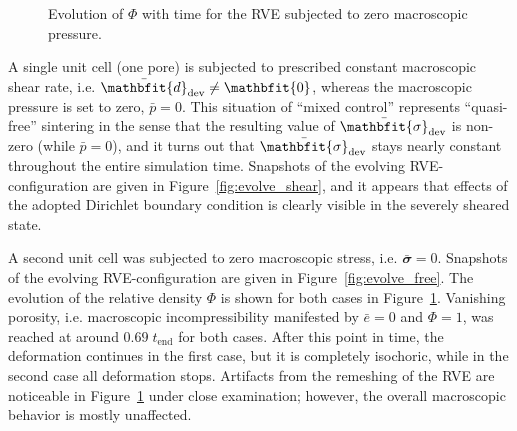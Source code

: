 \documentclass[12pt,a4paper,fleqn]{article}
\renewcommand{\ts}[1]{\mathbfit{#1}}
\newcommand{\figref}[1]{Figure~\ref{#1}}
\begin{document}
%
\begin{figure}[thpb!]
  \centering
  \caption{Evolution of $\Phi$ with time for the RVE subjected to zero macroscopic pressure.}
  \label{fig:evolve_graph}
\end{figure}


A single unit cell (one pore) is subjected to prescribed constant macroscopic shear rate, i.e. $\bar{\ts d}_\dev\neq \ts 0$, whereas the macroscopic pressure is set to zero, $\bar{p}=0$.
This situation of ``mixed control'' represents ``quasi-free'' sintering in the sense that the resulting value of $\bar{\ts\sigma}_\dev$ is non-zero (while $\bar p = 0 $), and it turns out that $\bar{\ts\sigma}_\dev$ stays nearly constant throughout the entire simulation time.
Snapshots of the evolving RVE-configuration are given in \figref{fig:evolve_shear}, and it appears that effects of the adopted Dirichlet boundary condition is clearly visible in the severely sheared state.

A second unit cell was subjected to zero macroscopic stress, i.e. $\bar{\ts\sigma} = \ts 0$. Snapshots of the evolving RVE-configuration are given in \figref{fig:evolve_free}. The evolution of the relative density $\Phi$ is shown for both cases in \figref{fig:evolve_graph}.
Vanishing porosity, i.e. macroscopic incompressibility manifested by $\bar e = 0$ and $\Phi = 1$, was reached at around $0.69\;t_{\mathrm{end}}$ for both cases.
After this point in time, the deformation continues in the first case, but it is completely isochoric, while in the second case all deformation stops.
Artifacts from the remeshing of the RVE are noticeable in \figref{fig:evolve_graph} under close examination; however, the overall macroscopic behavior is mostly unaffected.
\end{document}
